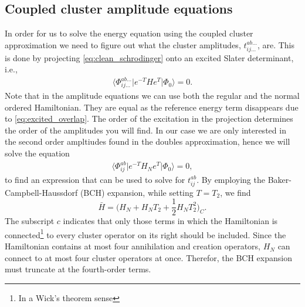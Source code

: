 \documentclass[
    a4paper, aps, twocolumn, floatfix, superscriptaddress,
    nofootinbib]{revtex4-1}
\newcommand{\1}{\mathds{1}}
\newcommand{\bra}[1]{\langle #1\lvert}
\newcommand{\ket}[1]{\rvert #1\rangle}
\newcommand{\kslat}{\ket{\Phi_0}}
\begin{document}
    \subsection{Coupled cluster amplitude equations}
        In order for us to solve the energy equation using the coupled cluster
        approximation we need to figure out what the cluster amplitudes,
        $t_{ij\dots}^{ab\dots}$, are. This is done by projecting
        \autoref{eq:clean_schrodinger} onto an excited Slater determinant, i.e.,
        \begin{align}
            \bra{\Phi_{ij\dots}^{ab\dots}}e^{-T}He^{T}\kslat
            = 0.
        \end{align}
        Note that in the amplitude equations we can use both the regular and the
        normal ordered Hamiltonian. They are equal as the reference energy term
        disappears due to \autoref{eq:excited_overlap}. The order of the
        excitation in the projection determines the order of the amplitudes you
        will find. In our case we are only interested in the second order
        ampltiudes found in the doubles approximation, hence we will solve the
        equation
        \begin{align}
            \bra{\Phi_{ij}^{ab}}e^{-T}H_N e^{T}\kslat = 0,
            \label{eq:doubles_amplitude_1}
        \end{align}
        to find an expression that can be used to solve for $t_{ij}^{ab}$.
        By employing the Baker-Campbell-Haussdorf (BCH) expansion,
        while setting $T= T_2$, we find
        \begin{equation}
                \bar{H}
                    = \Big(
                            H_N + H_NT_2
                            + \frac{1}{2}H_NT_2^2 \Big)_C.
        \label{eq:normal_order_expansion}
        \end{equation}
        The subscript $c$ indicates that only those terms in which the
        Hamiltonian is connected\footnote{In a Wick's theorem sense}
        to every cluster operator on its right should be included. Since
        the Hamiltonian contains at most four annihilation and creation
        operators, $H_N$ can connect to at most four cluster operators
        at once. Therefor, the BCH expansion must truncate at the
        fourth-order terms.
\end{document}

